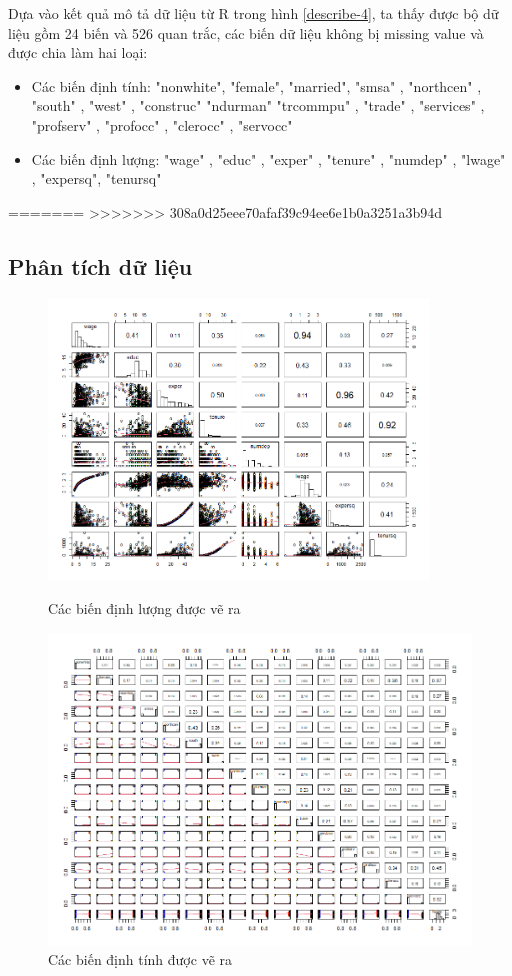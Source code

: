 Dựa vào kết quả mô tả dữ liệu từ R trong hình \ref{describe-4}, ta thấy được bộ dữ liệu gồm  24 biến và 526 quan trắc, các biến dữ liệu không bị missing value và được chia làm hai loại:
\begin{itemize}
	\item Các biến định tính: "nonwhite", "female", "married", "smsa"  ,   "northcen" , "south"  ,  "west"  ,   "construc" "ndurman"  "trcommpu" , "trade" ,   "services" , "profserv" , "profocc" , "clerocc" , "servocc" 
	\item Các biến định lượng: "wage"  ,  "educ"  ,  "exper" ,  "tenure" , "numdep" , "lwage" ,  "expersq", "tenursq"
\end{itemize}
=======
>>>>>>> 308a0d25eee70afaf39c94ee6e1b0a3251a3b94d
\subsection*{Phân tích dữ liệu}
\begin{figure}[H]
	\includegraphics[width=0.9\textwidth]{../Photo Of Result/Plot-dinhluong-data4}
	\caption{Các biến định lượng được vẽ ra}
	\includegraphics[width=\textwidth]{../Photo Of Result/Plot-dinhtinh-data4}
	\caption{Các biến định tính được vẽ ra}
	\label{plot_data4}
\end{figure}

